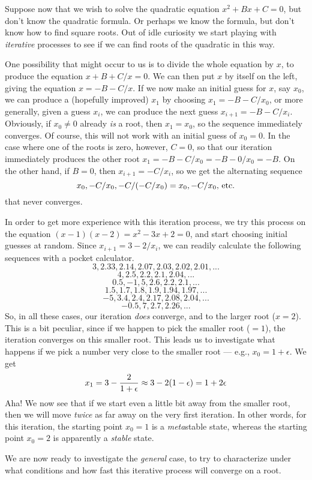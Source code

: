\documentclass[twocolumn,epsf]{snBaker}
\begin{document}
Suppose now that we wish to solve the quadratic equation $x^2+Bx+C=0$,
but don't know the quadratic formula.  Or perhaps we know the formula,
but don't know how to find square roots.  Out of idle curiosity we
start playing with {\it iterative} processes to see if we can find
roots of the quadratic in this way.

One possibility that might occur to us is to divide the whole equation
by $x$, to produce the equation $x+B+C/x=0$.  We can then put $x$ by
itself on the left, giving the equation $x=-B-C/x$.  If we now make an
initial guess for $x$, say $x_0$, we can produce a (hopefully
improved) $x_1$ by choosing $x_1=-B-C/{x_0}$, or more generally, given
a guess $x_i$, we can produce the next guess $x_{i+1}=-B-C/{x_i}$.
Obviously, if $x_0\not= 0$ already {\it is} a root, then $x_1=x_0$, so
the sequence immediately converges.  Of course, this will not work
with an initial guess of $x_0=0$.  In the case where one of the roots
is zero, however, $C=0$, so that our iteration immediately produces
the other root $x_1=-B-C/x_0=-B-0/x_0=-B$.  On the other hand, if
$B=0$, then $x_{i+1}=-C/{x_i}$, so we get the alternating sequence
$$x_0, -C/x_0, -C/(-C/x_0)=x_0, -C/x_0\hbox{, etc.}$$
that never converges.

In order to get more experience with this iteration process, we
try this process on the equation $(x-1)(x-2)=x^2-3x+2=0$, and start
choosing initial guesses at random.  Since $x_{i+1}=3-2/{x_i}$, we can
readily calculate the following sequences with a pocket calculator.
$$3, 2.33, 2.14, 2.07, 2.03, 2.02, 2.01, ...$$
$$4, 2.5, 2.2, 2.1, 2.04, ...$$
$$0.5, -1, 5, 2.6, 2.2, 2.1, ...$$
$$1.5, 1.7, 1.8, 1.9, 1.94, 1.97, ...$$
$$-5, 3.4,2.4, 2.17, 2.08, 2.04, ...$$
$$-0.5, 7, 2.7, 2.26, ...$$
So, in all these cases, our iteration {\it does} converge, and to the
larger root ($x=2$).  This is a bit peculiar, since if we happen to
pick the smaller root ($=1$), the iteration converges on this smaller
root.  This leads us to investigate what happens if we pick a number
very close to the smaller root --- e.g., $x_0=1+\epsilon$.  We get
$$x_1=3-{2\over 1+\epsilon}\approx 3-2(1-\epsilon)=1+2\epsilon$$
Aha!  We now see that if we start even a little bit away from the
smaller root, then we will move {\it twice} as far away on the very
first iteration.  In other words, for this iteration, the starting
point $x_0=1$ is a {\it meta}stable state, whereas the starting point
$x_0=2$ is apparently a {\it stable} state.

We are now ready to investigate the {\it general} case, to try to
characterize under what conditions and how fast this iterative process
will converge on a root.
\end{document}
